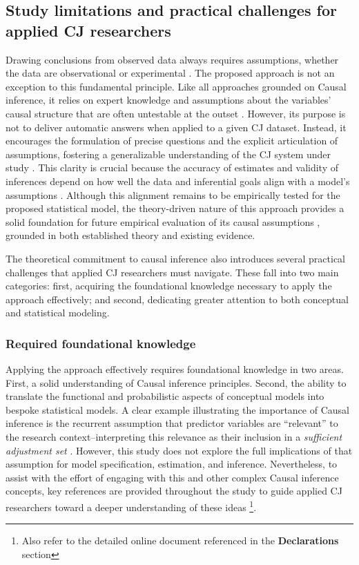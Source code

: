 \documentclass[
  authoryear,
  review,
  1p]{elsarticle}
\begin{document}
\subsection{Study limitations and practical challenges for applied CJ
researchers}\label{sec-discussion_challenges}

Drawing conclusions from observed data always requires assumptions,
whether the data are observational or experimental
\citep{Kohler_et_al_2019, Deffner_et_al_2022}. The proposed approach is
not an exception to this fundamental principle. Like all approaches
grounded on Causal inference, it relies on expert knowledge and
assumptions about the variables' causal structure that are often
untestable at the outset \citep{Hernan_et_al_2025}. However, its purpose
is not to deliver automatic answers when applied to a given CJ dataset.
Instead, it encourages the formulation of precise questions and the
explicit articulation of assumptions, fostering a generalizable
understanding of the CJ system under study
\citep{Rohrer_et_al_2022, Deffner_et_al_2022, Sterner_et_al_2024}. This
clarity is crucial because the accuracy of estimates and validity of
inferences depend on how well the data and inferential goals align with
a model's assumptions \citep{Kohler_et_al_2019}. Although this alignment
remains to be empirically tested for the proposed statistical model, the
theory-driven nature of this approach provides a solid foundation for
future empirical evaluation of its causal assumptions
\citep{Deffner_et_al_2022}, grounded in both established theory and
existing evidence.

The theoretical commitment to causal inference also introduces several
practical challenges that applied CJ researchers must navigate. These
fall into two main categories: first, acquiring the foundational
knowledge necessary to apply the approach effectively; and second,
dedicating greater attention to both conceptual and statistical
modeling.

\subsubsection{Required foundational
knowledge}\label{sec-discussion_challenges1}

Applying the approach effectively requires foundational knowledge in two
areas. First, a solid understanding of Causal inference principles.
Second, the ability to translate the functional and probabilistic
aspects of conceptual models into bespoke statistical models. A clear
example illustrating the importance of Causal inference is the recurrent
assumption that predictor variables are ``relevant'' to the research
context--interpreting this relevance as their inclusion in a
\emph{sufficient adjustment set}
\citep{Pearl_2009, Pearl_et_al_2016, Morgan_et_al_2014}. However, this
study does not explore the full implications of that assumption for
model specification, estimation, and inference. Nevertheless, to assist
with the effort of engaging with this and other complex Causal inference
concepts, key references are provided throughout the study to guide
applied CJ researchers toward a deeper understanding of these ideas
\footnote{Also refer to the detailed online document referenced in the
  \textbf{Declarations} section}.
\end{document}
